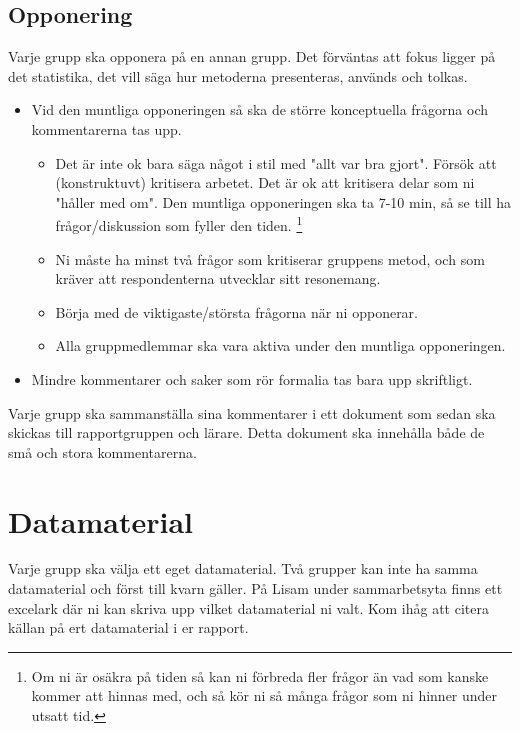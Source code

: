 \documentclass[a4paper]{article}
\begin{document}
\subsection*{Opponering}
Varje grupp ska opponera på en annan grupp. Det förväntas att fokus ligger på det statistika, det vill säga hur metoderna presenteras, används och tolkas.
\begin{itemize}
    \item Vid den muntliga opponeringen så ska de större konceptuella frågorna och kommentarerna tas upp.
    \begin{itemize}
      \item Det är inte ok bara säga något i stil med "allt var bra gjort". 
      Försök att (konstruktuvt) kritisera arbetet. Det är ok att kritisera delar som ni "håller med om". 
      Den muntliga opponeringen ska ta 7-10 min, så se till ha frågor/diskussion som fyller den tiden.
      \footnote{Om ni är osäkra på tiden så kan ni förbreda fler frågor än vad som kanske
      kommer att hinnas med, och så kör ni så många frågor som ni hinner under utsatt tid.}
      \item Ni måste ha minst två frågor som kritiserar gruppens metod, och som kräver att respondenterna utvecklar sitt resonemang.
      \item Börja med de viktigaste/största frågorna när ni opponerar.
      \item Alla gruppmedlemmar ska vara aktiva under den muntliga opponeringen.
    \end{itemize}
    \item Mindre kommentarer och saker som rör formalia tas bara upp skriftligt.
\end{itemize}
Varje grupp ska sammanställa sina kommentarer i ett dokument som sedan ska skickas till rapportgruppen och lärare. Detta dokument ska innehålla både de små och stora kommentarerna.

\section{Datamaterial} \label{sec:data}
Varje grupp ska välja ett eget datamaterial. Två grupper kan inte ha samma datamaterial och först till kvarn gäller. På Lisam under sammarbetsyta finns ett excelark där ni kan skriva upp vilket datamaterial ni valt. Kom ihåg att citera källan på ert datamaterial i er rapport.
\end{document}
